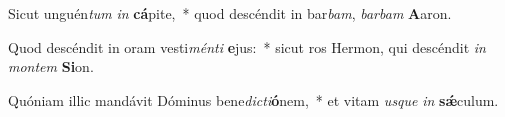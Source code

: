 \item Sicut unguén\textit{tum} \textit{in} \textbf{cá}pite,~* quod descéndit in bar\textit{bam}, \textit{bar}\textit{bam} \textbf{A}aron.
\item Quod descéndit in oram vesti\textit{mén}\textit{ti} \textbf{e}jus:~* sicut ros Hermon, qui descéndit \textit{in} \textit{mon}\textit{tem} \textbf{Si}on.
\item Quóniam illic mandávit Dóminus bene\textit{dic}\textit{ti}\textbf{ó}nem,~* et vitam \textit{us}\textit{que} \textit{in} \textbf{sǽ}culum.

